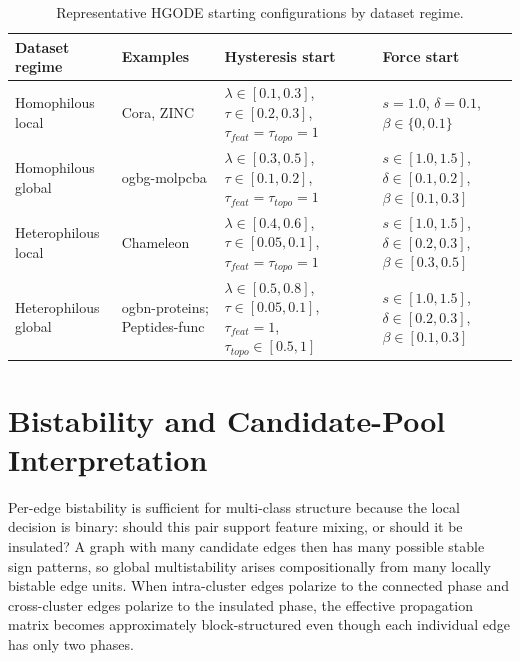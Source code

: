 \documentclass{article}
\theoremstyle{plain}
\theoremstyle{definition}
\theoremstyle{remark}
\begin{document}
\begin{table}[H]
    \caption{Representative HGODE starting configurations by dataset regime.}
    \label{tab:hparam_starts}
    \centering
    {\footnotesize
        \setlength{\tabcolsep}{3pt}
        \renewcommand{\arraystretch}{1.08}
        \begin{tabular}{p{}p{}p{}p{}}
            \toprule
            Dataset regime                       & Examples                     & Hysteresis start                                                                     & Force start                                                \\
            \midrule
            Homophilous local     & Cora, ZINC                   & $\lambda\in[0.1,0.3]$, $\tau\in[0.2,0.3]$, $\tau_{feat}=\tau_{topo}=1$               & $s=1.0$, $\delta=0.1$, $\beta\in\{0,0.1\}$                 \\
            Homophilous global    & ogbg-molpcba                 & $\lambda\in[0.3,0.5]$, $\tau\in[0.1,0.2]$, $\tau_{feat}=\tau_{topo}=1$               & $s\in[1.0,1.5]$, $\delta\in[0.1,0.2]$, $\beta\in[0.1,0.3]$ \\
            Heterophilous local   & Chameleon                    & $\lambda\in[0.4,0.6]$, $\tau\in[0.05,0.1]$, $\tau_{feat}=\tau_{topo}=1$              & $s\in[1.0,1.5]$, $\delta\in[0.2,0.3]$, $\beta\in[0.3,0.5]$ \\
            Heterophilous global  & ogbn-proteins; Peptides-func & $\lambda\in[0.5,0.8]$, $\tau\in[0.05,0.1]$, $\tau_{feat}=1$, $\tau_{topo}\in[0.5,1]$ & $s\in[1.0,1.5]$, $\delta\in[0.2,0.3]$, $\beta\in[0.1,0.3]$ \\
            \bottomrule
        \end{tabular}}
\end{table}

\section{Bistability and Candidate-Pool Interpretation}
\label{app:bistability_candidate_pool}

Per-edge bistability is sufficient for multi-class structure because the local
decision is binary: should this pair support feature mixing, or should it be
insulated? A graph with many candidate edges then has many possible stable sign
patterns, so global multistability arises compositionally from many locally
bistable edge units. When intra-cluster edges polarize to the connected phase
and cross-cluster edges polarize to the insulated phase, the effective
propagation matrix becomes approximately block-structured even though each
individual edge has only two phases.
\end{document}

